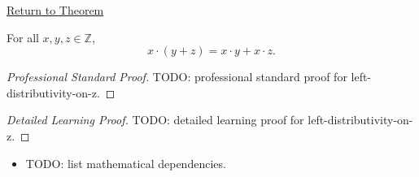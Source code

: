 \newpage
{}
\label{prf:left-distributivity-on-z}

\begin{remark*}[Return]
\hyperref[thm:left-distributivity-on-z]{Return to Theorem}
\end{remark*}

\begin{theorem*}
For all $x,y,z\in\mathbb{Z}$,
\[
x\cdot(y+z)=x\cdot y+x\cdot z.
\]
\end{theorem*}

\begin{proof}[Professional Standard Proof]
\LRAProofBodyStart
TODO: professional standard proof for left-distributivity-on-z.
\end{proof}

\begin{proof}[Detailed Learning Proof]
\LRAProofBodyStart
TODO: detailed learning proof for left-distributivity-on-z.
\end{proof}

\begin{remark*}
\end{remark*}

\begin{dependencies}
\begin{itemize}
  \item TODO: list mathematical dependencies.
\end{itemize}
\end{dependencies}

\clearpage
